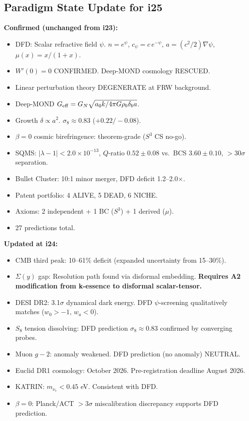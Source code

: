 \documentclass[11pt]{article}
\newcommand{\ee}[1]{\times 10^{#1}}
\newcommand{\Geff}{G_{\rm eff}}
\newcommand{\aM}{a_0}
\begin{document}
\subsection{Paradigm State Update for i25}

\begin{tcolorbox}[colback=gray!5!white, colframe=gray!70!black,
  title=\textbf{PARADIGM STATE (i24 $\to$ i25)}]

\textbf{Confirmed (unchanged from i23):}
\begin{itemize}
  \item DFD: Scalar refractive field $\psi$. $n = e^\psi$,
    $c_\psi = c\,e^{-\psi}$, $a = (c^2/2)\nabla\psi$, $\mu(x) = x/(1+x)$.
  \item $W'(0) = 0$ CONFIRMED. Deep-MOND cosmology RESCUED.
  \item Linear perturbation theory DEGENERATE at FRW background.
  \item Deep-MOND $\Geff = G_N\sqrt{\aM k/4\pi G\rho_b\delta_b a}$.
  \item Growth $\delta \propto a^2$. $\sigma_8 \approx 0.83$ ($+0.22/-0.08$).
  \item $\beta = 0$ cosmic birefringence: theorem-grade ($S^3$ CS no-go).
  \item SQMS: $|\lambda-1| < 2.0\ee{-13}$, $Q$-ratio $0.52 \pm 0.08$ vs.\
    BCS $3.60 \pm 0.10$, $>30\sigma$ separation.
  \item Bullet Cluster: 10:1 minor merger, DFD deficit 1.2--2.0$\times$.
  \item Patent portfolio: 4 ALIVE, 5 DEAD, 6 NICHE.
  \item Axioms: 2 independent + 1 BC ($S^3$) + 1 derived ($\mu$).
  \item 27 predictions total.
\end{itemize}

\textbf{Updated at i24:}
\begin{itemize}
  \item CMB third peak: 10--61\% deficit (expanded uncertainty from 15--30\%).
  \item $\Sigma(y)$ gap: Resolution path found via disformal embedding.
    \textbf{Requires A2 modification from k-essence to disformal scalar-tensor.}
  \item DESI DR2: 3.1$\sigma$ dynamical dark energy. DFD $\psi$-screening
    qualitatively matches ($w_0 > -1$, $w_a < 0$).
  \item $S_8$ tension dissolving: DFD prediction $\sigma_8 \approx 0.83$
    confirmed by converging probes.
  \item Muon $g-2$: anomaly weakened. DFD prediction (no anomaly) NEUTRAL.
  \item Euclid DR1 cosmology: October 2026. Pre-registration deadline
    August 2026.
  \item KATRIN: $m_{\nu_e} < 0.45$ eV. Consistent with DFD.
  \item $\beta = 0$: Planck/ACT $>3\sigma$ miscalibration discrepancy
    supports DFD prediction.
\end{itemize}

\end{tcolorbox}
\end{document}
